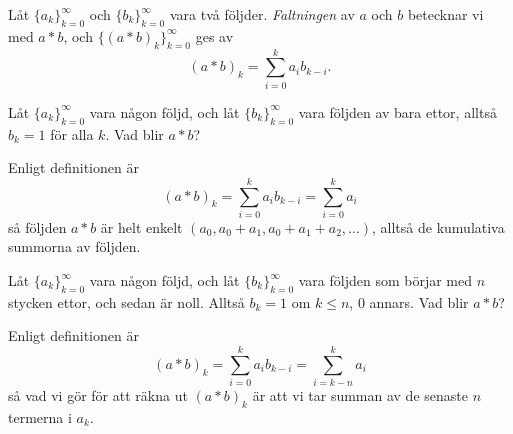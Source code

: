 \documentclass[nobib]{tufte-handout}
\begin{document}
\begin{definition}
    Låt $\{a_k\}_{k=0}^\infty$ och $\{b_k\}_{k=0}^\infty$ vara två följder. \emph{Faltningen} av $a$ och $b$ betecknar vi med $a*b$, och $\{(a * b)_k\}_{k=0}^\infty$ ges av
    $$(a*b)_k = \sum_{i=0}^{k} a_i b_{k-i}.$$
\end{definition}

\begin{example}
    Låt $\{a_k\}_{k=0}^\infty$ vara någon följd, och låt $\{b_k\}_{k=0}^\infty$ vara följden av bara ettor, alltså $b_k = 1$ för alla $k$. Vad blir $a*b$?

    Enligt definitionen är
    $$(a*b)_k = \sum_{i=0}^{k} a_i b_{k-i} = \sum_{i=0}^{k} a_i$$
    så följden $a*b$ är helt enkelt $(a_0, a_0 + a_1, a_0 + a_1 + a_2, \ldots)$, alltså de kumulativa summorna av följden.
\end{example}

\begin{example}
    Låt $\{a_k\}_{k=0}^\infty$ vara någon följd, och låt $\{b_k\}_{k=0}^\infty$ vara följden som börjar med $n$ stycken ettor, och sedan är noll. Alltså $b_k = 1$ om $k \leq n$, $0$ annars. Vad blir $a*b$?

    Enligt definitionen är
    $$(a*b)_k = \sum_{i=0}^{k} a_i b_{k-i} = \sum_{i=k-n}^{k} a_i$$
    så vad vi gör för att räkna ut $(a*b)_k$ är att vi tar summan av de senaste $n$ termerna i $a_k$.
\end{example}
\end{document}

